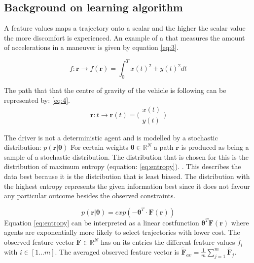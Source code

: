 \subsection{Background on learning algorithm}
A feature values maps a trajectory onto a scalar and the higher the scalar value the more discomfort is experienced. An example of a that measures the amount of accelerations in a maneuver is given by equation \ref{eq:3}.

\begin{equation}\label{eq:3}
f:\bm{r}\xrightarrow{}f(\bm{r})=\int_{0}^{T}\ddot{x}(t)^{2}+\ddot{y}(t)^{2} dt
\end{equation}

The path that that the centre of gravity of the vehicle is following can be represented by: \ref{eq:4}.
\begin{equation}\label{eq:4}
\bm{r}:t \xrightarrow{}\bm{r}(t) =  \bigl( \begin{smallmatrix} x(t)\\ y(t) \end{smallmatrix}\bigr)
\end{equation}

The driver is not a deterministic agent and is modelled by a stochastic distribution: $p(\bm{r}|\bm{\theta})$ For certain weights $\bm{\theta} \in \mathbb{R}^N$ a path $\bm{r}$ is produced as being a sample of a stochastic distribution. The distribution that is chosen for this is the distribution of maximum entropy (equation: \ref{eq:entropy}). \cite{Ziebart2008, Kretzschmar2014}. This describes the data best because it is the distribution that is least biased. \cite{Kuderer2015a} 
The distribution with the highest entropy represents the given information best since it does not favour any particular outcome besides the observed constraints. \cite{Abbeel2004}
	
	
\begin{equation}\label{eq:entropy}
	p(\bm{r}|\bm{\theta}) = exp(-\bm{\theta}^T\cdot \bm{F}(\bm{r}))
\end{equation}
Equation \ref{eq:entropy} can be interpreted as a linear costfunction $\bm{\theta}^T\bm{F}(\bm{r})$ where agents are exponentially more likely to select trajectories with lower cost. \cite{Kuderer2015a}
The observed feature vector $\tilde{\bm{F}} \in \mathbb{R}^N$ has on its entries the different feature values $\tilde{f_i}$ with $i \in [1...m]$. The averaged observed feature vector is $\tilde{\bm{F}}_{av} = \frac{1}{m}\sum_{j=1}^{m}\tilde{\bm{F}_j}$.\\

